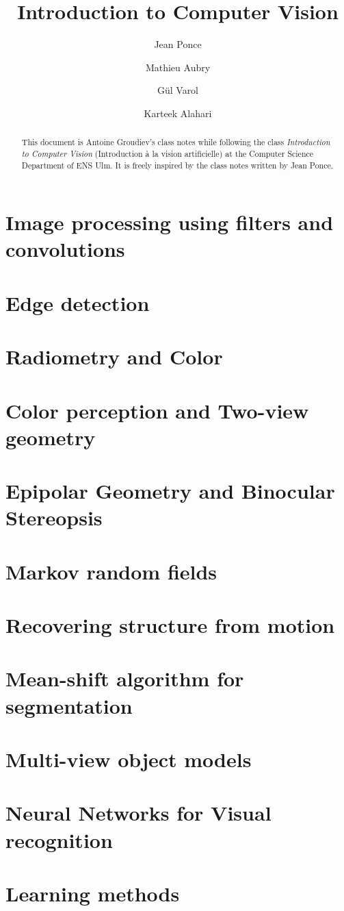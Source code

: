 \documentclass[toc, titlepaged]{../cs-classes/cs-classes}
\title{Introduction to Computer Vision}
\author{Jean Ponce\and Mathieu Aubry\and Gül Varol\and Karteek Alahari}
\begin{document}
\begin{abstract}
    This document is Antoine Groudiev's class notes while following the class \emph{Introduction to Computer Vision} (Introduction à la vision artificielle) at the Computer Science Department of ENS Ulm. It is freely inspired by the class notes written by Jean Ponce.
\end{abstract}




\section{Image processing using filters and convolutions}

\section{Edge detection}

\section{Radiometry and Color}

\section{Color perception and Two-view geometry}

\section{Epipolar Geometry and Binocular Stereopsis}

\section{Markov random fields}

\section{Recovering structure from motion}

\section{Mean-shift algorithm for segmentation}

\section{Multi-view object models}

\section{Neural Networks for Visual recognition}

\section{Learning methods}
\end{document}
